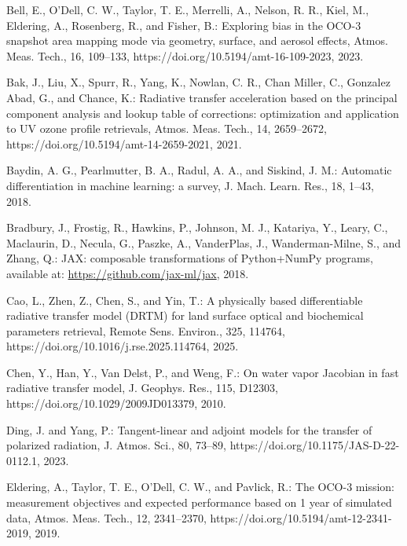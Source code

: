 \documentclass[gmd, manuscript]{copernicus}
\begin{document}
\begingroup
\raggedright
\begin{thebibliography}{}

Bell, E., O'Dell, C. W., Taylor, T. E., Merrelli, A., Nelson, R. R.,
Kiel, M., Eldering, A., Rosenberg, R., and Fisher, B.: Exploring bias in the
OCO-3 snapshot area mapping mode via geometry, surface, and aerosol effects,
Atmos. Meas. Tech., 16, 109--133, https://doi.org/10.5194/amt-16-109-2023,
2023.

Bak, J., Liu, X., Spurr, R., Yang, K., Nowlan, C. R., Chan Miller, C.,
Gonzalez Abad, G., and Chance, K.: Radiative transfer acceleration based on the
principal component analysis and lookup table of corrections: optimization and
application to UV ozone profile retrievals, Atmos. Meas. Tech., 14, 2659--2672,
https://doi.org/10.5194/amt-14-2659-2021, 2021.

Baydin, A. G., Pearlmutter, B. A., Radul, A. A., and Siskind, J. M.:
Automatic differentiation in machine learning: a survey, J. Mach. Learn. Res.,
18, 1--43, 2018.

Bradbury, J., Frostig, R., Hawkins, P., Johnson, M. J., Katariya, Y.,
Leary, C., Maclaurin, D., Necula, G., Paszke, A., VanderPlas, J.,
Wanderman-Milne, S., and Zhang, Q.: JAX: composable transformations of
Python+NumPy programs, available at: \url{https://github.com/jax-ml/jax},
2018.

Cao, L., Zhen, Z., Chen, S., and Yin, T.: A physically based differentiable
radiative transfer model (DRTM) for land surface optical and biochemical
parameters retrieval, Remote Sens. Environ., 325, 114764,
https://doi.org/10.1016/j.rse.2025.114764, 2025.

Chen, Y., Han, Y., Van Delst, P., and Weng, F.: On water vapor Jacobian in
fast radiative transfer model, J. Geophys. Res., 115, D12303,
https://doi.org/10.1029/2009JD013379, 2010.

Ding, J. and Yang, P.: Tangent-linear and adjoint models for the transfer of
polarized radiation, J. Atmos. Sci., 80, 73--89,
https://doi.org/10.1175/JAS-D-22-0112.1, 2023.

Eldering, A., Taylor, T. E., O'Dell, C. W., and Pavlick, R.: The OCO-3
mission: measurement objectives and expected performance based on 1 year of
simulated data, Atmos. Meas. Tech., 12, 2341--2370,
https://doi.org/10.5194/amt-12-2341-2019, 2019.


\end{thebibliography}
\end{document}
